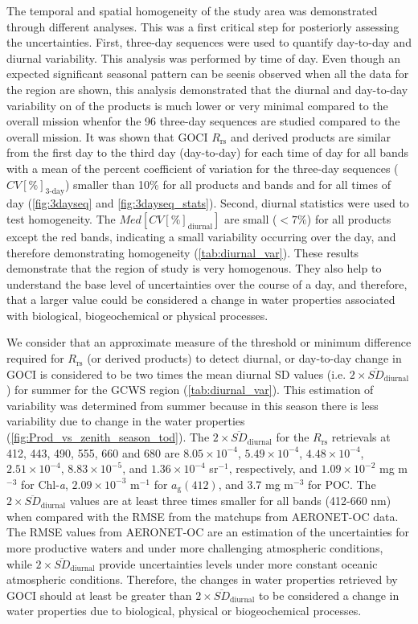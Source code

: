 \documentclass[remotesensing,article,submit,moreauthors,pdftex,10pt,a4paper]{Definitions/mdpi}
\begin{document}
The temporal and spatial homogeneity of the study area was demonstrated through different analyses. This was a first critical step for posteriorly assessing the uncertainties. First, three-day sequences were used to quantify day-to-day and diurnal variability. This analysis was performed by time of day. Even though an expected significant seasonal pattern can be seenis observed when all the data for the region are shown, this analysis demonstrated that the diurnal and day-to-day variability on of the products is much lower or very minimal compared to the overall mission whenfor the 96 three-day sequences are studied compared to the overall mission. It was shown that GOCI $R_\text{rs}$ and derived products are similar from the first day to the third day (day-to-day) for each time of day for all bands with a mean of the percent coefficient of variation for the three-day sequences ($CV[\%]_\text{3-day}$) smaller than 10\% for all products and bands and for all times of day (\autoref{fig:3dayseq} and \autoref{fig:3dayseq_stats}). Second, diurnal statistics were used to test homogeneity. The $Med[CV[\%]_\text{diurnal}]$ are small ($<7\%$) for all products except the red bands, indicating a small variability occurring over the day, and therefore demonstrating homogeneity (\autoref{tab:diurnal_var}). These results demonstrate that the region of study is very homogenous. They also help to understand the base level of uncertainties over the course of a day, and therefore, that a larger value could be considered a change in water properties associated with biological, biogeochemical or physical processes.

We consider that an approximate measure of the threshold or minimum difference required for $R_\text{rs}$ (or derived products) to detect diurnal, or day-to-day change in GOCI is considered to be two times the mean diurnal SD values (i.e. $2\times \overline{SD}_\text{diurnal}$) for summer for the GCWS region (\autoref{tab:diurnal_var}). This estimation of variability was determined from summer because in this season there is less variability due to change in the water properties (\autoref{fig:Prod_vs_zenith_season_tod}). The $2\times \overline{SD}_\text{diurnal}$ for the $R_\text{rs}$ retrievals at 412, 443, 490, 555, 660 and 680 are $8.05\times10^{-4}$, $5.49\times10^{-4}$, $4.48\times10^{-4}$, $2.51\times10^{-4}$, $8.83\times10^{-5}$, and $1.36\times10^{-4}$ sr$^{-1}$, respectively, and $1.09\times10^{-2}$  mg m$^{-3}$ for Chl-{\it a},  $2.09\times10^{-3}$ m$^{-1}$ for $a_\text{g}(412)$, and 3.7 mg m$^{-3}$ for POC. The $2\times \overline{SD}_\text{diurnal}$ values are at least three times smaller for all bands (412-660 nm) when compared with the RMSE from the matchups from AERONET-OC data. The RMSE values from AERONET-OC are an estimation of the uncertainties for more productive waters and under more challenging atmospheric conditions, while $2\times \overline{SD}_\text{diurnal}$ provide uncertainties levels under more constant oceanic atmospheric conditions.  Therefore, the changes in water properties retrieved by GOCI should at least be greater than $2\times \overline{SD}_\text{diurnal}$ to be considered a change in water properties due to biological, physical or biogeochemical processes.
\end{document}
